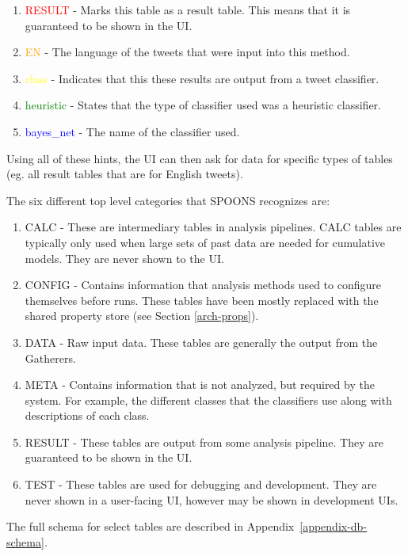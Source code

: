 \documentclass[12pt]{ucthesis}
\begin{document}
\begin{enumerate}
   \item \textcolor{red}{RESULT} - Marks this table as a result table. This means that it is guaranteed to be shown in the UI.
   \item \textcolor{orange}{EN} - The language of the tweets that were input into this method.
   \item \textcolor{yellow}{class} - Indicates that this these results are output from a tweet classifier.
   \item \textcolor{green}{heuristic} - States that the type of classifier used was a heuristic classifier.
   \item \textcolor{blue}{bayes\_net} - The name of the classifier used.
\end{enumerate}

Using all of these hints, the UI can then ask for data for specific types of tables (eg. all result tables that are for English tweets).

The six different top level categories that SPOONS recognizes are:

\begin{enumerate}
   \item CALC - These are intermediary tables in analysis pipelines. CALC tables are typically only used when large sets of past data are needed for cumulative models. They are never shown to the UI.
   \item CONFIG - Contains information that analysis methods used to configure themselves before runs. These tables have been mostly replaced with the shared property store (see Section \ref{arch-props}).
   \item DATA - Raw input data. These tables are generally the output from the Gatherers.
   \item META - Contains information that is not analyzed, but required by the system. For example, the different classes that the classifiers use along with descriptions of each class.
   \item RESULT - These tables are output from some analysis pipeline. They are guaranteed to be shown in the UI.
   \item TEST - These tables are used for debugging and development. They are never shown in a user-facing UI, however may be shown in development UIs.
\end{enumerate}

The full schema for select tables are described in Appendix~\ref{appendix-db-schema}.
\end{document}
